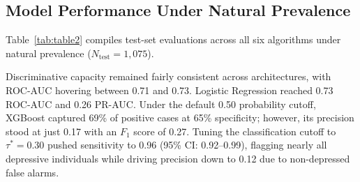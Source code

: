 \documentclass[conference]{IEEEtran}
\begin{document}
\subsection{Model Performance Under Natural Prevalence}
Table~\ref{tab:table2} compiles test-set evaluations across all six algorithms under natural prevalence ($N_{\text{test}} = 1,075$). 

Discriminative capacity remained fairly consistent across architectures, with ROC-AUC hovering between 0.71 and 0.73. Logistic Regression reached 0.73 ROC-AUC and 0.26 PR-AUC. Under the default 0.50 probability cutoff, XGBoost captured 69\% of positive cases at 65\% specificity; however, its precision stood at just 0.17 with an $F_1$ score of 0.27. Tuning the classification cutoff to $\tau^* = 0.30$ pushed sensitivity to 0.96 (95\% CI: 0.92--0.99), flagging nearly all depressive individuals while driving precision down to 0.12 due to non-depressed false alarms.
\end{document}
